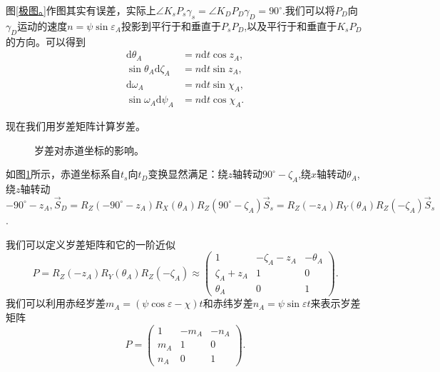 \documentclass[11pt, a4paper, oneside]{ctexart}
\numberwithin{equation}{subsection}
\begin{document}
图\ref{极图。}作图其实有误差，实际上$\angle{K_{s}P_{s}\gamma_{s}}=\angle{K_{D}P_{D}\gamma_{D}}=90^{\circ}$.我们可以将$P_{D}$向$\gamma_{D}$运动的速度$n=\psi\sin\varepsilon_{A}$投影到平行于和垂直于$P_{s}P_{D}$,以及平行于和垂直于$K_{s}P_{D}$的方向。可以得到
\begin{align}
\mathrm{d}\theta_{A}&=n\mathrm{d}t\cos z_{A},\\
\sin\theta_{A}\mathrm{d}\zeta_{A}&=n\mathrm{d}t\sin z_{A},\\
\mathrm{d}\omega_{A}&=n\mathrm{d}t\sin\chi_{A},\\
\sin\omega_{A}\mathrm{d}\psi_{A}&=n\mathrm{d}t\cos\chi_{A}.
\end{align}

现在我们用岁差矩阵计算岁差。
\begin{figure}[!htp]
\centering
{}
\captionsetup{justification=raggedright, singlelinecheck=false}
\caption{岁差对赤道坐标的影响。}
\label{岁差对赤道坐标的影响。}
\end{figure}

如图\ref{岁差对赤道坐标的影响。}所示，赤道坐标系自$t_{s}$向$t_{D}$变换显然满足：绕$z$轴转动$90^{\circ}-\zeta_{A}$,绕$x$轴转动$\theta_{A}$,绕$z$轴转动$-90^{\circ}-z_{A},\vec{S}_{D}=R_{Z}\left(-90^{\circ}-z_{A}\right)R_{X}\left(\theta_{A}\right)R_{Z}\left(90^{\circ}-\zeta_{A}\right)\vec{S}_{s}=R_{Z}\left(-z_{A}\right)R_{Y}\left(\theta_{A}\right)R_{Z}\left(-\zeta_{A}\right)\vec{S}_{s}$.

我们可以定义岁差矩阵和它的一阶近似
\begin{equation}
P=R_Z\left(-z_A\right)R_Y\left(\theta_A\right)R_Z\left(-\zeta_A\right)\approx\begin{pmatrix}
1 & -\zeta_A-z_A & -\theta_A\\
\zeta_A+z_A & 1 & 0\\
\theta_A & 0 & 1
\end{pmatrix}.
\end{equation}
我们可以利用赤经岁差$m_{A}=\left(\psi\cos\varepsilon-\chi\right)t$和赤纬岁差$n_{A}=\psi\sin\varepsilon t$来表示岁差矩阵
\begin{equation}
P=\begin{pmatrix}
1 & -m_{A} & -n_{A}\\
m_{A} & 1 & 0\\
n_A & 0 & 1
\end{pmatrix}.
\end{equation}
\end{document}
